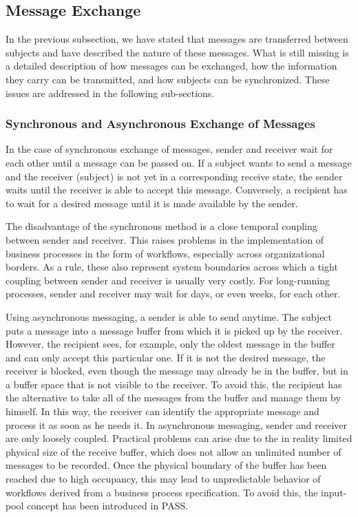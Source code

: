 \subsection{Message Exchange}

In the previous subsection, we have stated that messages are transferred between subjects and have described the nature of these messages. What is still missing is a detailed description of how messages can be exchanged, how the information they carry can be transmitted, and how subjects can be synchronized. These issues are addressed in the following sub-sections.

\subsubsection{Synchronous and Asynchronous Exchange of Messages}
In the case of synchronous exchange of messages, sender and receiver wait for each other until a message can be passed on. If a subject wants to send a message and the receiver (subject) is not yet in a corresponding receive state, the sender waits until the receiver is able to accept this message. Conversely, a recipient has to wait for a desired message until it is made available by the sender.\

The disadvantage of the synchronous method is a close temporal coupling between sender and receiver. This raises problems in the implementation of business processes in the form of workflows, especially across organizational borders. As a rule, these also represent system boundaries across which a tight coupling between sender and receiver is usually very costly. For long-running processes, sender and receiver may wait for days, or even weeks, for each other.\

Using asynchronous messaging, a sender is able to send anytime. The subject puts a message into a message buffer from which it is picked up by the receiver. However, the recipient sees, for example, only the oldest message in the buffer and can only accept this particular one. If it is not the desired message, the receiver is blocked, even though the message may already be in the buffer, but in a buffer space that is not visible to the receiver. To avoid this, the recipient has the alternative to take all of the messages from the buffer and manage them by himself. In this way, the receiver can identify the appropriate message and process it as soon as he needs it. In asynchronous messaging, sender and receiver are only loosely coupled. Practical problems can arise due to the in reality limited physical size of the receive buffer, which does not allow an unlimited number of messages to be recorded. Once the physical boundary of the buffer has been reached due to high occupancy, this may lead to unpredictable behavior of workflows derived from a business process specification. To avoid this, the input-pool concept has been introduced in PASS.


